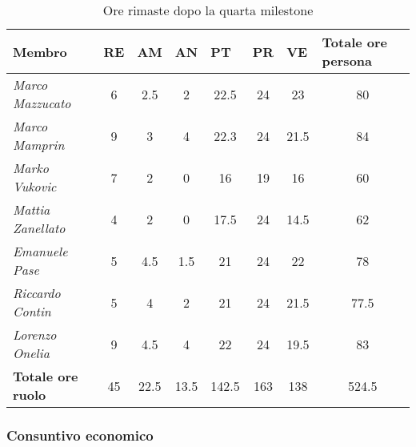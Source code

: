 \begin{table}[H]
    \centering
    \begin{tabular}{|l|c|c|c|c|c|c|c|}
    \hline
    \textbf{Membro} & \multicolumn{1}{l|}{\textbf{RE}} & \multicolumn{1}{l|}{\textbf{AM}} & \multicolumn{1}{l|}{\textbf{AN}} & \multicolumn{1}{l|}{\textbf{PT}} & \multicolumn{1}{l|}{\textbf{PR}} & \multicolumn{1}{l|}{\textbf{VE}} & \multicolumn{1}{l|}{\textbf{Totale ore persona}} \\ \hline
    \textit{Marco Mazzucato}  & 6  & 2.5  & 2     & 22.5  & 24  & 23     & 80     \\ \hline
    \textit{Marco Mamprin}    & 9  & 3    & 4     & 22.3  & 24  & 21.5   & 84     \\ \hline
    \textit{Marko Vukovic}    & 7  & 2    & 0     & 16    & 19  & 16     & 60     \\ \hline
    \textit{Mattia Zanellato} & 4  & 2    & 0     & 17.5  & 24  & 14.5   & 62     \\ \hline
    \textit{Emanuele Pase}    & 5  & 4.5  & 1.5   & 21    & 24  & 22     & 78     \\ \hline
    \textit{Riccardo Contin}  & 5  & 4    & 2     & 21    & 24  & 21.5   & 77.5   \\ \hline
    \textit{Lorenzo Onelia}   & 9  & 4.5  & 4     & 22    & 24  & 19.5   & 83     \\ \hline
    \textbf{Totale ore ruolo} & 45 & 22.5 & 13.5  & 142.5 & 163 & 138    & 524.5  \\ \hline
    \end{tabular}
    \caption{Ore rimaste dopo la quarta milestone}
\end{table}

\subsubsection{Consuntivo economico}

